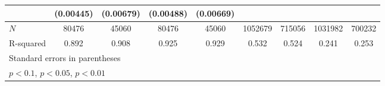 {\begin{tabular}{l*{8}{c}}
            &   (0.00445)         &   (0.00679)         &   (0.00488)         &   (0.00669)         &                     &                     &                     &                     \\
\midrule
\(N\)       &       80476         &       45060         &       80476         &       45060         &     1052679         &      715056         &     1031982         &      700232         \\
R-squared   &       0.892         &       0.908         &       0.925         &       0.929         &       0.532         &       0.524         &       0.241         &       0.253         \\
\bottomrule
\multicolumn{9}{l}{\footnotesize Standard errors in parentheses}\\
\multicolumn{9}{l}{\footnotesize \sym{*} \(p<0.1\), \sym{**} \(p<0.05\), \sym{***} \(p<0.01\)}\\
\end{tabular}
}
